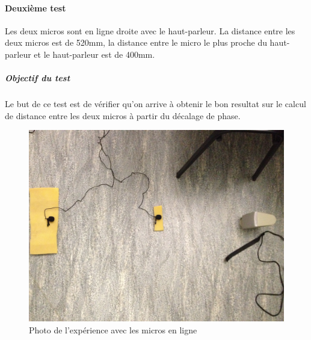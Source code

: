 \documentclass[12pt,a4paper]{report}
\begin{document}
 \paragraph{Deuxième test} 
 Les deux micros sont en ligne droite avec le haut-parleur. La distance entre les deux micros est de 520mm, la distance entre le micro le plus proche du haut-parleur et le haut-parleur est de 400mm.
 \subparagraph{Objectif du test}
 Le but de ce test est de vérifier qu'on arrive à obtenir le bon resultat sur le calcul de distance entre les deux micros à partir du décalage de phase.
 \begin{figure}[H]
 \includegraphics[width=\textwidth]{../tests/lecture_de_signaux_carres/donnees11-03/test_2.jpg} 
 \caption{Photo de l'expérience avec les micros en ligne}
 \end{figure}
 	
\end{document}

